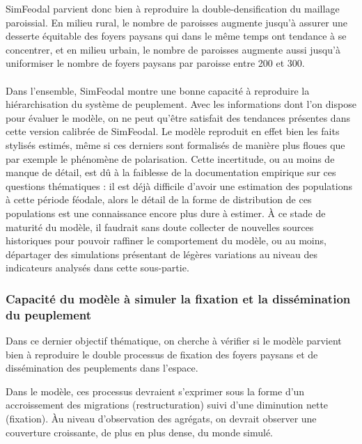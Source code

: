 SimFeodal parvient donc bien à reproduire la double-densification du maillage paroissial.
En milieu rural, le nombre de paroisses augmente jusqu'à assurer une desserte équitable des foyers paysans qui dans le même temps ont tendance à se concentrer, et en milieu urbain, le nombre de paroisses augmente aussi jusqu'à uniformiser le nombre de foyers paysans par paroisse entre 200 et 300.

\bigskip
\paragraph[Conclusion intermédiaire]{}
Dans l'ensemble, SimFeodal montre une bonne capacité à reproduire la hiérarchisation du système de peuplement.
Avec les informations dont l'on dispose pour évaluer le modèle, on ne peut qu'être satisfait des tendances présentes dans cette version calibrée de SimFeodal.
Le modèle reproduit en effet bien les faits stylisés estimés, même si ces derniers sont formalisés de manière plus floues que par exemple le phénomène de polarisation.
Cette incertitude, ou au moins de manque de détail, est dû à la faiblesse de la documentation empirique sur ces questions thématiques : il est déjà difficile d'avoir une estimation des populations à cette période féodale, alors le détail de la forme de distribution de ces populations est une connaissance encore plus dure à estimer.
À ce stade de maturité du modèle, il faudrait sans doute collecter de nouvelles sources historiques pour pouvoir raffiner le comportement du modèle, ou au moins, départager des simulations présentant de légères variations au niveau des indicateurs analysés dans cette sous-partie.

\subsubsection{Capacité du modèle à simuler la fixation et la dissémination du peuplement \label{sssec:fixation-dissemination}}

Dans ce dernier objectif thématique, on cherche à vérifier si le modèle parvient bien à reproduire le double processus de fixation des foyers paysans et de dissémination des peuplements dans l'espace.

Dans le modèle, ces processus devraient s'exprimer sous la forme d'un accroissement des migrations (restructuration) suivi d'une diminution nette (fixation).
Àu niveau d'observation des agrégats, on devrait observer une couverture croissante, de plus en plus dense, du monde simulé.

